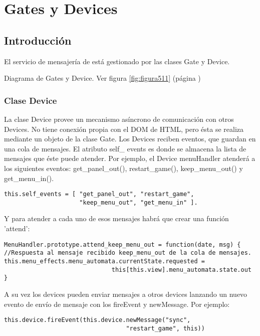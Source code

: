 \section{Gates y Devices}
\label{sec:gates_devices}

\subsection{Introducción}
\label{subsection:intro_gates}

El servicio de mensajería de \lluvia{} está gestionado por las clases Gate y Device.

Diagrama de Gates y Device. Ver figura \ref{fig:figura511} (página \pageref{fig:figura511})

\subsubsection{Clase Device}
\label{subsubsection:device}

La clase Device provee un mecanismo asíncrono de comunicación con otros Devices. No tiene conexión propia con el DOM de HTML, pero ésta se realiza mediante un objeto de la clase 
Gate. Los Devices reciben eventos, que guardan en una cola de mensajes. El atributo self\_ events es donde se almacena la lista de mensajes que éste puede atender. Por ejemplo, el 
Device menuHandler atenderá a los siguientes eventos: get\_panel\_out(), restart\_game(), keep\_menu\_out() y get\_menu\_in().\\

\begin{verbatim}
this.self_events = [ "get_panel_out", "restart_game", 
                     "keep_menu_out", "get_menu_in" ].
\end{verbatim}

Y para atender a cada uno de esos mensajes habrá que crear una función 'attend':\

\begin{verbatim}
MenuHandler.prototype.attend_keep_menu_out = function(date, msg) {
//Respuesta al mensaje recibido keep_menu_out de la cola de mensajes.
this.menu_effects.menu_automata.currentState.requested = 
                              this[this.view].menu_automata.state.out
}
\end{verbatim}


A su vez los devices pueden enviar mensajes a otros devices lanzando un nuevo evento de envío de mensaje con los fireEvent y newMessage.
Por ejemplo:

\begin{verbatim}
this.device.fireEvent(this.device.newMessage("sync", 
                                  "restart_game", this))
\end{verbatim}

